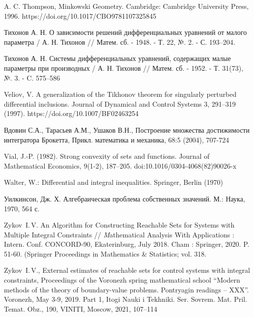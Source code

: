 \documentclass[../main.tex]{subfiles}
\begin{document}
\begin{thebibliography}{99}
A. C. Thompson, Minkowski Geometry. Cambridge: Cambridge University Press, 1996. 
https://doi.org/10.1017/CBO9781107325845


Тихонов А. Н. О зависимости решений дифференциальных уравнений от малого параметра / А. Н. Тихонов // Матем. сб. - 1948. - Т. 22, №. 2. - С. 193–204.

Тихонов А. Н. Системы дифференциальных уравнений, содержащих малые параметры при производных / А. Н. Тихонов // Матем. сб. - 1952. - Т. 31(73), №.
3. - C. 575–586

Veliov, V. A generalization of the Tikhonov theorem for singularly perturbed differential inclusions. Journal of Dynamical and Control Systems 3, 291–319 (1997). https://doi.org/10.1007/BF02463254

Вдовин С.А., Тарасьев А.М., Ушаков В.Н., Построение множества достижимости интегратора Брокетта, Прикл. математика и механика, 68:5 (2004), 707-724

Vial, J.-P. (1982). Strong convexity of sets and functions. Journal of Mathematical Economics, 9(1-2), 187–205. doi:10.1016/0304-4068(82)90026-x

Walter, W.: Differential and integral inequalities. Springer, Berlin (1970)

Уилкинсон, Дж. Х.
Алгебраическая проблема собственных значений.
М.: Наука, 1970, 564 с.

Zykov~I.\,V. An Algorithm for Constructing Reachable Sets for Systems with Multiple Integral Constraints  // {\textit Mathematical Analysis With Applications : Intern. Conf. CONCORD-90}, Ekaterinburg, July 2018. Cham : Springer, 2020. P. 51-60. (Springer Proceedings in Mathematics \& Statistics; vol. 318. 

Zykov~I.\,V., External estimates of reachable sets for control systems with integral constraints, Proceedings of the Voronezh spring mathematical school “Modern methods of the theory of boundary-value problems. Pontryagin readings – XXX”. Voronezh, May 3-9, 2019. Part 1, Itogi Nauki i Tekhniki. Ser. Sovrem. Mat. Pril. Temat. Obz., 190, VINITI, Moscow, 2021, 107–114 



\end{thebibliography}
\end{document}
